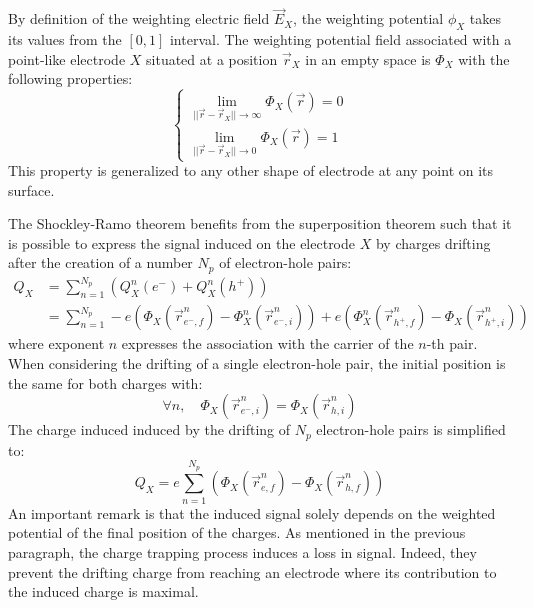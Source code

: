 By definition of the weighting electric field $\vec{E}_X$, the weighting potential $\phi_X$ takes its values from the $[0,1]$ interval. The weighting potential field associated with a point-like electrode $X$ situated at a position $\vec{r}_X$ in an empty space is $\Phi_X$ with the following properties:
\begin{equation}
\label{eq:ramo-particle}
\begin{cases}
\lim_{||\vec{r} - \vec{r}_X|| \to \infty} \Phi_X(\vec{r}) = 0 \\
\lim_{||\vec{r} - \vec{r}_X|| \to 0} \Phi_X(\vec{r}) = 1
\end{cases}
\end{equation}
This property is generalized to any other shape of electrode at any point on its surface.

The Shockley-Ramo theorem benefits from the superposition theorem such that it is possible to express the signal induced on the electrode $X$ by charges drifting after the creation of a number $N_p$ of electron-hole pairs:
\begin{equation}
\begin{split}
Q_X &= \sum_{n=1}^{N_p} \left( Q_X^n(e^-) + Q_X^n(h^+) \right) \\
&= \sum_{n=1}^{N_p} -e \left( \Phi_X (\vec{r}_{e^-,f}^n) - \Phi_X^n (\vec{r}_{e^-,i}^n) \right) +e \left( \Phi_X^n (\vec{r}_{h^+,f}^n) - \Phi_X (\vec{r}_{h^+,i}^n) \right)
\end{split}
\end{equation}
where exponent $n$ expresses the association with the carrier of the $n$-th pair.
When considering the drifting of a single electron-hole pair, the initial position is the same for both charges with:
\begin{equation}
\forall n, \quad \Phi_X(\vec{r}_{e^-,i}^n) = \Phi_X (\vec{r}_{h,i}^n)
\end{equation}
The charge induced induced by the drifting of $N_p$ electron-hole pairs is simplified to:
\begin{equation}
\label{eq:ramo-induced-charge}
Q_X = e \sum_{n=1}^{N_p} \left( \Phi_X (\vec{r}_{e,f}^n) - \Phi_X (\vec{r}_{h,f}^n) \right)
\end{equation}
An important remark is that the induced signal solely depends on the weighted potential of the final position of the charges. As mentioned in the previous paragraph, the charge trapping process induces a loss in signal. Indeed, they prevent the drifting charge from reaching an electrode where its contribution to the induced charge is maximal.

